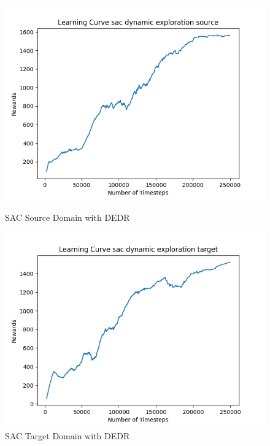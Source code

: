 \documentclass[11pt]{article}
\begin{document}
\begin{figure}[H]
    \centering
    \begin{minipage}{0.45\textwidth}
        \centering
        \includegraphics[width=\textwidth]{../images/Learning_Curve_SAC_DE_Source.png}
        \caption{SAC Source Domain with DEDR}
        \label{fig:sac_source_dedr}
    \end{minipage}
    \hfill
    \begin{minipage}{0.45\textwidth}
        \centering
        \includegraphics[width=\textwidth]{../images/Learning_Curve_SAC_DE_Target.png}
        \caption{SAC Target Domain with DEDR}
        \label{fig:sac_target_dedr}
    \end{minipage}
    \vfill

\end{figure}
\end{document}
